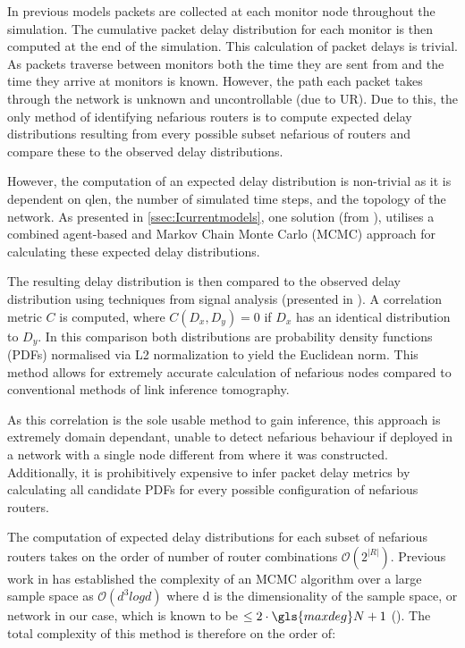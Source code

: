 In previous models packets are collected at each monitor node throughout the simulation. The cumulative packet delay distribution for each monitor is then computed at the end of the simulation. This calculation of packet delays is trivial. As packets traverse between monitors both the time they are sent from and the time they arrive at monitors is known. However, the path each packet takes through the network is unknown and uncontrollable (due to UR). Due to this, the only method of identifying nefarious routers is to compute expected delay distributions resulting from every possible subset nefarious of routers and compare these to the observed delay distributions.\par
However, the computation of an expected delay distribution is non-trivial as it is dependent on \gls{qlen}, the number of simulated time steps, and the topology of the network. As presented in \cref{ssec:Icurrentmodels}, one solution (from \cite{barnes_stochastic_2020}), utilises a combined agent-based and Markov Chain Monte Carlo (MCMC) approach for calculating these expected delay distributions.\par
The resulting delay distribution is then compared to the observed delay distribution using techniques from signal analysis (presented in \cite{lynn_introduction_2016}). A correlation metric $C$ is computed, where $C(D_x,D_y)=0$ if $D_x$ has an identical distribution to $D_y$. In this comparison both distributions are probability density functions (PDFs) normalised via L2 normalization to yield the Euclidean norm. This method allows for extremely accurate calculation of nefarious nodes compared to conventional methods of link inference tomography.\par
As this correlation is the sole usable method to gain inference, this approach is extremely domain dependant, unable to detect nefarious behaviour if deployed in a network with a single node different from where it was constructed. Additionally, it is prohibitively expensive to infer packet delay metrics by calculating all candidate PDFs for every possible configuration of nefarious routers.\par
The computation of expected delay distributions for each subset of nefarious routers takes on the order of number of router combinations $\mathcal{O}(2^{|R|})$. Previous work in \cite{belloni_computational_2009} has established the complexity of an MCMC algorithm over a large sample space as $\mathcal{O}(d^3 log d)$ where d is the dimensionality of the sample space, or network in our case, which is known to be $\leq 2\cdot \gls{maxdeg} N + 1$ (\cite{erdos_chromatic_1980}). The total complexity of this method is therefore on the order of:
